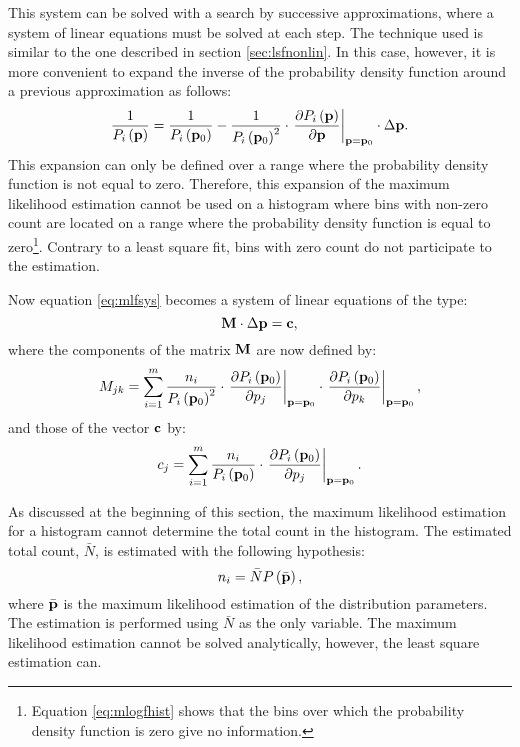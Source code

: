 \documentclass[twoside]{book}
\begin{document}
This system can be solved with a search by successive
approximations, where a system of linear equations must be solved
at each step. The technique used is similar to the one described
in section \ref{sec:lsfnonlin}. In this case, however, it is more
convenient to expand the inverse of the probability density
function around a previous approximation as follows:
\begin{equation}
{\displaystyle 1\over\displaystyle P_i\left({\bf p}\right)} =
{\displaystyle 1\over\displaystyle P_i\left({\bf p}_0\right)} -
{\displaystyle 1\over\displaystyle P_i\left({\bf
p}_0\right)^2}\cdot \left.{\displaystyle\partial P_i\left({\bf
p}\right) \over\displaystyle\partial{\bf p}}\right|_{{\bf p}={\bf
p}_0}\cdot\Delta{\bf p}.
\end{equation}
This expansion can only be defined over a range where the
probability density function is not equal to zero. Therefore, this
expansion of the maximum likelihood estimation cannot be used on a
histogram where bins with non-zero count are located on a range
where the probability density function is equal to
zero\footnote{Equation \ref{eq:mlogfhist} shows that the bins over
which the probability density function is zero give no
information.}. Contrary to a least square fit, bins with zero
count do not participate to the estimation.

Now equation \ref{eq:mlfsys} becomes a system of linear equations
of the type:
\begin{equation}
\label{eq:mlflinequs}
  {\bf M}\cdot\Delta{\bf p}={\bf c},
\end{equation}
where the components of the matrix ${\bf M}$ are now defined by:
\begin{equation}
\label{eq:mlfmatrix}
 M_{jk}=\sum_{i=1}^m {\displaystyle
n_i\over\displaystyle P_i\left({\bf p}_0\right)^2
}\cdot\left.{\displaystyle\partial P_i\left({\bf p}_0\right)
\over\displaystyle\partial p_j} \right|_{{\bf p}={\bf
p}_0}\cdot\left.{\displaystyle\partial P_i\left({\bf p}_0\right)
\over\displaystyle\partial p_k} \right|_{{\bf p}={\bf p}_0},
\end{equation}
and those of the vector ${\bf c}$ by:
\begin{equation}
\label{eq:mlfvector}
 c_j=\sum_{i=1}^m {\displaystyle
n_i\over\displaystyle P_i\left({\bf p}_0\right)
}\cdot\left.{\displaystyle\partial P_i\left({\bf p}_0\right)
\over\displaystyle\partial p_j} \right|_{{\bf p}={\bf p}_0}.
\end{equation}

As discussed at the beginning of this section, the maximum
likelihood estimation for a histogram cannot determine the total
count in the histogram. The estimated total count, $\bar{N}$, is
estimated with the following hypothesis:
\begin{equation}
   n_i=\bar{N}P\left(\bar{\bf p}\right),
\end{equation}
where $\bar{\bf p}$ is the maximum likelihood estimation of the
distribution parameters. The estimation is performed using
$\bar{N}$ as the only variable. The maximum likelihood estimation
cannot be solved analytically, however, the least square
estimation can.
\end{document}
